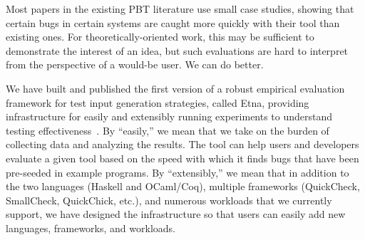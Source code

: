 

%
%
Most papers in the existing PBT literature use small case studies,
showing that certain bugs in certain systems
are caught more quickly with their tool than existing ones. For
theoretically-oriented work, this may be sufficient
to demonstrate the interest of an idea, but such evaluations
are hard to interpret from the perspective of a would-be user.
We can do better.

We have built and published the first version of a robust empirical evaluation
framework for
test input generation strategies, called Etna, providing infrastructure
for easily and extensibly running experiments to understand testing
effectiveness~\cite{shi2023etna}.  By ``easily,'' we mean that we take on the burden of
collecting data and analyzing the results.  The tool
can help users and developers evaluate a given tool based on
the
speed with which it finds bugs that have been pre-seeded in example programs. By
``extensibly,'' we mean that in addition to the two languages (Haskell and
OCaml/Coq), multiple frameworks (QuickCheck, SmallCheck, QuickChick, etc.), and
numerous workloads that we currently support, we have designed the
infrastructure so that users can easily add new
languages, frameworks, and workloads.

